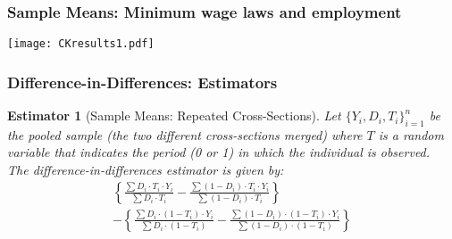 \documentclass{beamer}
\numberwithin{equation}{section}
\newtheorem{esti}{Estimator}
\begin{document}
\begin{frame}
  \frametitle{Sample Means: Minimum wage laws and employment}
\begin{center}
  \texttt{[image: CKresults1.pdf]}
\end{center}
\end{frame}


\begin{frame}
  \frametitle{Difference-in-Differences: Estimators}


\begin{esti}[Sample Means: Repeated Cross-Sections]\small
Let
$\{Y_i, D_i, T_i \}_{i=1}^n$ be the
pooled sample (the two different cross-sections merged) where $T$
is a random variable that indicates the period (0 or 1) in which the
individual is observed.\\\bigskip The difference-in-differences estimator is given by:
\begin{multline}
\left\{\frac{\sum  D_i\cdot T_i\cdot Y_i}{\sum D_i\cdot T_i} -
\frac{\sum  (1-D_i)\cdot T_i\cdot Y_i}{\sum (1-D_i)\cdot T_i}\right\}\\ -
\left\{\frac{\sum D_i\cdot(1-T_i)\cdot Y_i}{\sum D_i\cdot(1-T_i)} -
\frac{\sum (1-D_i)\cdot (1-T_i)\cdot Y_i}{\sum (1-D_i)\cdot (1-T_i)}\right\}\nonumber
\end{multline}
\end{esti}
\end{frame}
\end{document}
